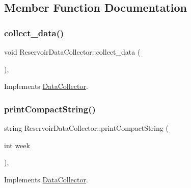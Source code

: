 \subsection{Member Function Documentation}
\mbox{\label{classReservoirDataCollector_a5c2e1355c40e45b409168e98245eef95_a5c2e1355c40e45b409168e98245eef95}} 
\subsubsection{\texorpdfstring{collect\+\_\+data()}{collect\_data()}}
{\footnotesize\ttfamily void Reservoir\+Data\+Collector\+::collect\+\_\+data (\begin{DoxyParamCaption}{ }\end{DoxyParamCaption})\hspace{0.3cm}{\ttfamily [override]}, {\ttfamily [virtual]}}



Implements \mbox{\hyperlink{classDataCollector_a01486bf58acbe37b203f97b3b9a79c40_a01486bf58acbe37b203f97b3b9a79c40}{Data\+Collector}}.

\mbox{\label{classReservoirDataCollector_a0b68d7fa4a6d704350340d1ac3e8a1d2_a0b68d7fa4a6d704350340d1ac3e8a1d2}} 
\subsubsection{\texorpdfstring{print\+Compact\+String()}{printCompactString()}}
{\footnotesize\ttfamily string Reservoir\+Data\+Collector\+::print\+Compact\+String (\begin{DoxyParamCaption}\item[{int}]{week }\end{DoxyParamCaption})\hspace{0.3cm}{\ttfamily [override]}, {\ttfamily [virtual]}}



Implements \mbox{\hyperlink{classDataCollector_a2eac264fa5612aed5a830b12de4f4ae3_a2eac264fa5612aed5a830b12de4f4ae3}{Data\+Collector}}.

